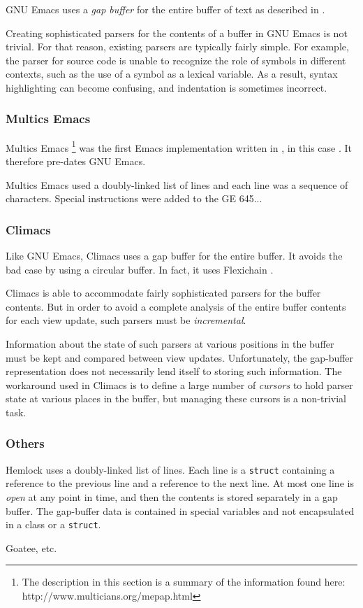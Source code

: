GNU Emacs \cite{GNUEmacsLispReferenceManual}
\cite{CraftOfTextEditiing} uses a \emph{gap buffer} for the entire
buffer of text as described in .

Creating sophisticated parsers for the contents of a buffer in GNU
Emacs is not trivial.  For that reason, existing parsers are typically
fairly simple.  For example, the parser for \commonlisp{} source code
is unable to recognize the role of symbols in different contexts, such
as the use of a \commonlisp{} symbol as a lexical variable.  As a
result, syntax highlighting can become confusing, and indentation is
sometimes incorrect.

\subsubsection{Multics Emacs}

Multics Emacs%
\footnote{The description in this section is a summary of the
  information found here: http://www.multicians.org/mepap.html}
was the first Emacs implementation written in \lisp{}, in this case
\multics{} \maclisp{}.  It therefore pre-dates GNU Emacs.

Multics Emacs used a doubly-linked list of lines and each line was a
sequence of characters.  Special instructions were added to the GE
645...

\subsubsection{Climacs}

Like GNU Emacs, Climacs uses a gap buffer for the entire buffer.  It
avoids the bad case by using a circular buffer.  In fact, it uses
Flexichain \cite{flexichain}.

Climacs is able to accommodate fairly sophisticated parsers for the
buffer contents.  But in order to avoid a complete analysis of the
entire buffer contents for each view update, such parsers must be
\emph{incremental}.

Information about the state of such parsers at various positions in
the buffer must be kept and compared between view updates.
Unfortunately, the gap-buffer representation does not necessarily lend
itself to storing such information.  The workaround used in Climacs is
to define a large number of \emph{cursors} to hold parser state at
various places in the buffer, but managing these cursors is a
non-trivial task.

\subsubsection{Others}

Hemlock uses a doubly-linked list of lines.  Each line is a
\texttt{struct} containing a reference to the previous line and a
reference to the next line.  At most one line is \emph{open} at any
point in time, and then the contents is stored separately in a gap
buffer.  The gap-buffer data is contained in special variables and not
encapsulated in a class or a \texttt{struct}.

Goatee, etc.

